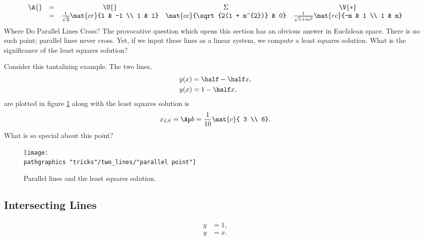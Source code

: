 %
  \begin{equation*}   %
    \begin{array}{ccccc}
      \A{} & = & \U{} & \Sigma & \V{*} \\
        & = & \frac{1} {\sqrt{2}} \mat{cr}{1 & -1 \\ 1 & 1} 
            & \mat{cc}{\sqrt{2(1 + m^{2})} & 0}
            & \frac{1} {\sqrt{1 + m^{2}}} \mat{rc}{-m & 1 \\ 1 & m}
    \end{array}
  \end{equation*}
Where Do Parallel Lines Cross? The provocative question which opens this section has an obvious answer in Euclidean space. There is no such point; parallel lines never cross. Yet, if we input these lines as a linear system, we compute a least squares solution. What is the significance of the least squares solution?

Consider this tantalizing example. The two lines,
  \begin{equation*}   %
    \begin{split}
      y(x) &= \half - \half x, \\
      y(x) &= 1 - \half x,
    \end{split}
  \end{equation*}
are plotted in figure \ref{fig:tantalizing} along with the least squares solution is 
  \begin{equation*}   %
      x_{LS} = \Ap b = \frac{1}{10}\mat{c}{ 3 \\ 6}.
  \end{equation*}
What is so special about this point?
\begin{figure}[htbp] %
   \centering
     \texttt{[image: \\pathgraphics "tricks"/two\_lines/"parallel point"]} 
   \caption{Parallel lines and the least squares solution.}
   \label{fig:tantalizing}
\end{figure}

\subsection{Intersecting Lines}
  \begin{equation*}   %
   \begin{split}
      y &= 1, \\
      y &= x .
   \end{split}
  \end{equation*}

